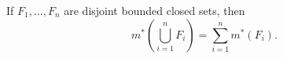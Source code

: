 \begin{lemma}[Lemma 3.5]
If $F_1, \ldots, F_n$ are disjoint bounded closed sets, then
$$
m^*\left(\bigcup_{i=1}^n F_i\right) = \sum_{i=1}^n m^*(F_i).
$$
\end{lemma}
